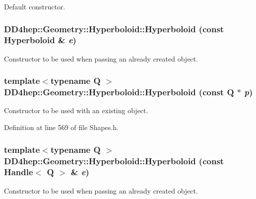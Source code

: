 Default constructor. \hypertarget{class_d_d4hep_1_1_geometry_1_1_hyperboloid_a440775dc04e1e4b02254cce1867c7ee9}{
\subsubsection[{Hyperboloid}]{\setlength{\rightskip}{0pt plus 5cm}DD4hep::Geometry::Hyperboloid::Hyperboloid (const {\bf Hyperboloid} \& {\em e})}}
\label{class_d_d4hep_1_1_geometry_1_1_hyperboloid_a440775dc04e1e4b02254cce1867c7ee9}


Constructor to be used when passing an already created object. \hypertarget{class_d_d4hep_1_1_geometry_1_1_hyperboloid_ab4f5034fea85831e9fdda65dfcc717c7}{
\subsubsection[{Hyperboloid}]{\setlength{\rightskip}{0pt plus 5cm}template$<$typename Q $>$ DD4hep::Geometry::Hyperboloid::Hyperboloid (const Q $\ast$ {\em p})}}
\label{class_d_d4hep_1_1_geometry_1_1_hyperboloid_ab4f5034fea85831e9fdda65dfcc717c7}


Constructor to be used with an existing object. 

Definition at line 569 of file Shapes.h.\hypertarget{class_d_d4hep_1_1_geometry_1_1_hyperboloid_a38aabbad56ee5c27ad2d67df74bac127}{
\subsubsection[{Hyperboloid}]{\setlength{\rightskip}{0pt plus 5cm}template$<$typename Q $>$ DD4hep::Geometry::Hyperboloid::Hyperboloid (const {\bf Handle}$<$ Q $>$ \& {\em e})}}
\label{class_d_d4hep_1_1_geometry_1_1_hyperboloid_a38aabbad56ee5c27ad2d67df74bac127}


Constructor to be used when passing an already created object. 


